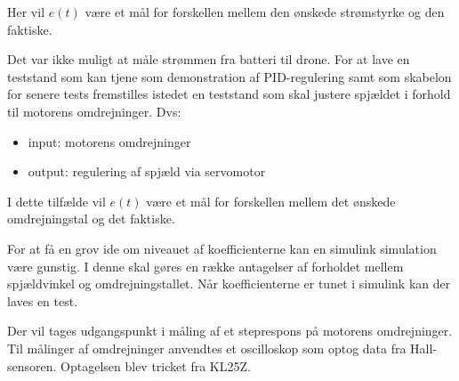 Her vil $e(t)$ være et mål for forskellen mellem den ønskede strømstyrke og den faktiske.

Det var ikke muligt at måle strømmen fra batteri til drone. For at lave en teststand som kan tjene som demonstration af PID-regulering samt som skabelon for senere tests fremstilles istedet en teststand som skal justere spjældet i forhold til motorens omdrejninger. Dvs:

\begin{itemize}
\item input: motorens omdrejninger
\item output: regulering af spjæld via servomotor
\end{itemize}

I dette tilfælde vil $e(t)$ være et mål for forskellen mellem det ønskede omdrejningstal og det faktiske.

For at få en grov ide om niveauet af koefficienterne kan en simulink simulation være gunstig. I denne skal gøres en række antagelser af forholdet mellem spjældvinkel og omdrejningstallet. Når koefficienterne er tunet i simulink kan der laves en test.





\label{sec:steprespons}

Der vil tages udgangspunkt i måling af et steprespons på motorens omdrejninger. Til målinger af omdrejninger anvendtes et oscilloskop som optog data fra Hall-sensoren. Optagelsen blev tricket fra KL25Z.%

